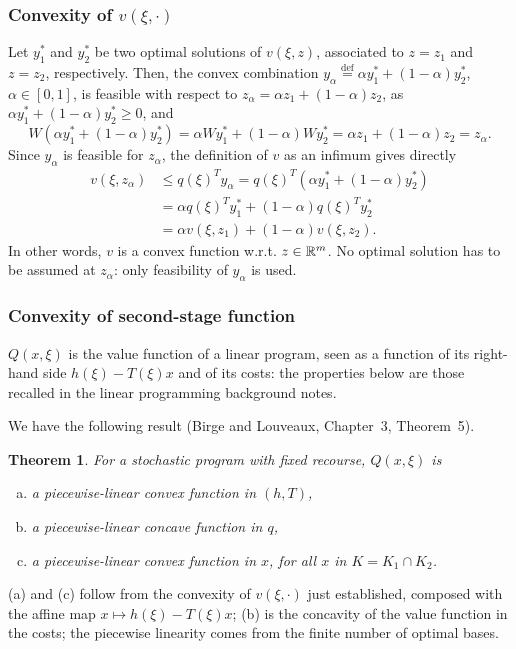 \documentclass[aspectratio=169]{beamer}
\newtheorem{theo}{Theorem}
\begin{document}
\begin{frame}
\frametitle{Convexity of $v(\xi, \cdot)$}

Let $y^*_1$ and $y^*_2$ be two optimal solutions of $v(\xi, z)$, associated to $z = z_1$ and $z = z_2$, respectively.
Then, the convex combination $y_{\alpha} \overset{\mathrm{def}}{=} \alpha y_1^*+(1-\alpha)y_2^*$, $\alpha \in [0,1]$, is feasible with respect to $z_{\alpha} = \alpha z_1 + (1-\alpha) z_2$, as $\alpha y_1^*+(1-\alpha)y_2^* \geq 0$, and
$$
W(\alpha y_1^*+(1-\alpha)y_2^*)
= \alpha W y_1^* + (1-\alpha) W y_2^*
= \alpha z_1 + (1-\alpha) z_2 = z_{\alpha}.
$$
Since $y_{\alpha}$ is feasible for $z_{\alpha}$, the definition of $v$ as an infimum gives directly
\begin{align*}
v(\xi, z_{\alpha}) & \leq q(\xi)^T y_{\alpha} = q(\xi)^T(\alpha y_1^*+(1-\alpha)y_2^*) \\
& = \alpha q(\xi)^T y_1^*+(1-\alpha)q(\xi)^Ty_2^* \\
& = \alpha v(\xi, z_1) + (1-\alpha) v(\xi, z_2).
\end{align*}
In other words, $v$ is a convex function w.r.t. $z \in {\mathbb{R}}^m$.
No optimal solution has to be assumed at $z_{\alpha}$: only feasibility of $y_{\alpha}$ is used.


\end{frame}

\begin{frame}
\frametitle{Convexity of second-stage function}

$Q(x,\xi)$ is the value function of a linear program, seen as a function of its right-hand side $h(\xi)-T(\xi)x$ and of its costs: the properties below are those recalled in the linear programming background notes.

We have the following result (Birge and Louveaux, Chapter~3, Theorem~5).
\begin{theo}
For a stochastic program with fixed recourse, $Q(x,\xi)$ is
\begin{enumerate}[(a)]
\item
a piecewise-linear convex function in $(h,T)$,
\item
a piecewise-linear concave function in $q$,
\item
a piecewise-linear convex function in $x$, for all $x$ in $K = K_1 \cap K_2$.
\end{enumerate}
\end{theo}

(a) and (c) follow from the convexity of $v(\xi, \cdot)$ just established, composed with the affine map $x \mapsto h(\xi)-T(\xi)x$; (b) is the concavity of the value function in the costs; the piecewise linearity comes from the finite number of optimal bases.

\end{frame}
\end{document}
